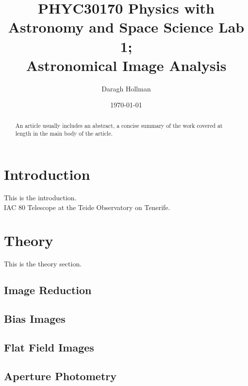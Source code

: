 \documentclass[%
reprint,
amsmath,amssymb,
aps,
]{revtex4-2}
\begin{document}
	
	
	\title{PHYC30170 Physics with Astronomy and Space Science Lab 1;\\Astronomical Image Analysis}%
	
	\author{Daragh Hollman}
	
	\date{\today}
	
	\begin{abstract}
		An article usually includes an abstract, a concise summary of the work
		covered at length in the main body of the article. 
	\end{abstract}

	\maketitle
	
	\section{Introduction}
	
		This is the introduction.\\
		
		IAC 80 Telescope at the Teide Observatory on Tenerife.
	
	
	\section{Theory}
	
		This is the theory section.
	
		\subsection{Image Reduction}
			\subsection{Bias Images}
			
			\subsection{Flat Field Images}
		
		\subsection{Aperture Photometry}
		
\end{document}
